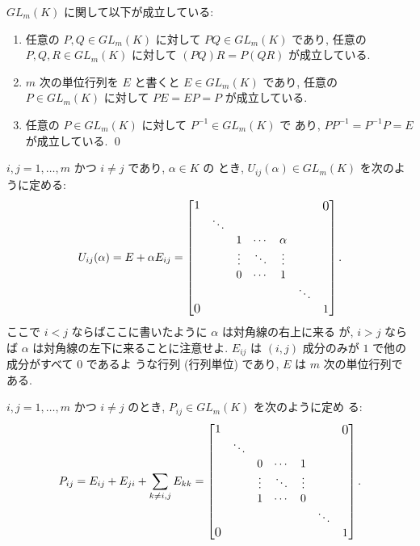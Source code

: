 \documentclass[12pt,twoside]{jarticle}
\begin{document}
\begin{question}[一般線形群]
  $GL_m(K)$ に関して以下が成立している:
  \begin{enumerate}
  \item 任意の $P,Q\in GL_m(K)$ に対して $PQ\in GL_m(K)$ であり, 
    任意の $P,Q,R\in GL_m(K)$ に対して $(PQ)R=P(QR)$ が成立している.
  \item $m$ 次の単位行列を $E$ と書くと $E\in GL_m(K)$ であり, 
    任意の $P\in GL_m(K)$ に対して $PE=EP=P$ が成立している.
  \item 任意の $P\in GL_m(K)$ に対して $P^{-1}\in GL_m(K)$ で
    あり, $PP^{-1}=P^{-1}P=E$ が成立している.
    \qed
  \end{enumerate}
\end{question}


$i,j=1,\ldots,m$ かつ $i\ne j$ であり, $\alpha\in K$ の
とき, $U_{ij}(\alpha)\in GL_m(K)$ を次のように定める:
\begin{equation*}
  U_{ij}(\alpha) = E + \alpha E_{ij} =
  \begin{bmatrix}
    1 &        &        &        &        & & \bigzerou \\
      & \ddots &        &        &        & & \\
      &        & 1      & \cdots & \alpha & & \\
      &        & \vdots & \ddots & \vdots & & \\
      &        & 0      & \cdots & 1      & & \\
      &        &        &        &        & \ddots & \\
    \bigzerol & &       &        &        &        & 1 \\
  \end{bmatrix}.
\end{equation*}
ここで $i<j$ ならばここに書いたように $\alpha$ は対角線の右上に来る
が, $i>j$ ならば $\alpha$ は対角線の左下に来ることに注意せよ.
$E_{ij}$ は $(i,j)$ 成分のみが $1$ で他の成分がすべて $0$ であるよ
うな行列 (行列単位) であり, $E$ は $m$ 次の単位行列である.

$i,j=1,\ldots,m$ かつ $i\ne j$ のとき, $P_{ij}\in GL_m(K)$ を次のように定め
る:
\begin{equation*}
  P_{ij} = E_{ij} + E_{ji} + \sum_{k\ne i,j} E_{kk} =
  \begin{bmatrix}
    1 &        &        &        &        & & \bigzerou \\
      & \ddots &        &        &        & & \\
      &        & 0      & \cdots & 1      & & \\
      &        & \vdots & \ddots & \vdots & & \\
      &        & 1      & \cdots & 0      & & \\
      &        &        &        &        & \ddots & \\
    \bigzerol & &       &        &        &        & 1 \\
  \end{bmatrix}.
\end{equation*}
\end{document}

